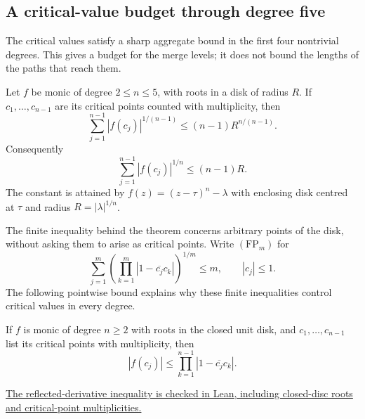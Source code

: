 \documentclass[11pt]{article}
\begin{document}
\subsection*{A critical-value budget through degree five}

The critical values satisfy a sharp aggregate bound in the first four
nontrivial degrees.  This gives a budget for the merge levels; it does not
bound the lengths of the paths that reach them.

\begin{theorem}
\label{res:critical-value-budget}
Let $f$ be monic of degree $2\le n\le5$, with roots in a disk of radius
$R$.  If $c_1,\ldots,c_{n-1}$ are its critical points counted with
multiplicity, then
\begin{equation}\label{eq:critical-value-power-budget}
 \sum_{j=1}^{n-1}|f(c_j)|^{1/(n-1)}\le(n-1)R^{n/(n-1)}.
\end{equation}
Consequently
\[
 \sum_{j=1}^{n-1}|f(c_j)|^{1/n}\le(n-1)R.
\]
The constant is attained by $f(z)=(z-\tau)^n-\lambda$ with enclosing
disk centred at $\tau$ and radius $R=|\lambda|^{1/n}$.
\end{theorem}

The finite inequality behind the theorem concerns arbitrary points of the
disk, without asking them to arise as critical points.  Write $(\mathrm{FP}_m)$
for
\[
 \sum_{j=1}^m\left(\prod_{k=1}^m
       |1-\overline{c_j}c_k|\right)^{1/m}\le m,
 \qquad |c_j|\le1.
\]
The following pointwise bound explains why these finite inequalities
control critical values in every degree.

\begin{lemma}\label{res:reflected-critical-value}
If $f$ is monic of degree $n\ge2$ with roots in the closed unit disk,
and $c_1,\ldots,c_{n-1}$ list its critical points with multiplicity, then
\begin{equation}\label{eq:critical-reflected-product}
 |f(c_j)|\le\prod_{k=1}^{n-1}|1-\overline{c_j}c_k|.
\end{equation}
\end{lemma}

\noindent\href{https://github.com/wcook04/plectis-erdos/blob/bb4e24651b37cd096d3749ef299c3317930b3a3b/ErdosProblems/Erdos1041/PaperReflectedCompletion.lean#L254}{The reflected-derivative inequality is checked in Lean, including closed-disc roots and critical-point multiplicities.}
\end{document}
